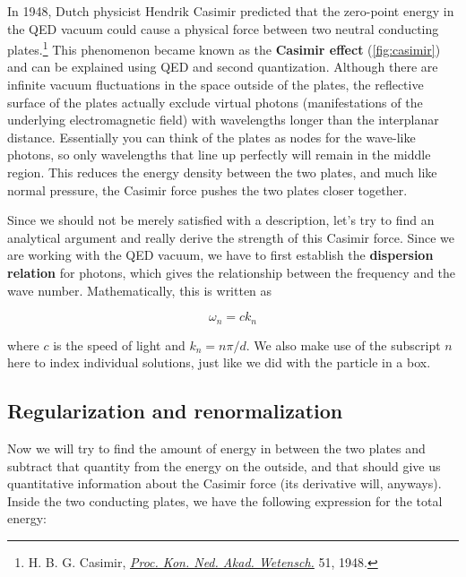 In 1948, Dutch physicist Hendrik Casimir predicted that the zero-point energy in the QED vacuum could cause a physical force between two neutral conducting plates.\footnote{H. B. G. Casimir, \href{http://www.dwc.knaw.nl/DL/publications/PU00018547.pdf}{\emph{Proc. Kon. Ned. Akad. Wetensch.}} 51, 1948.} 
This phenomenon became known as the \textbf{Casimir effect} (\autoref{fig:casimir}) and can be explained using QED and second quantization. 
Although there are infinite vacuum fluctuations in the space outside of the plates, the reflective surface of the plates actually exclude virtual photons (manifestations of the underlying electromagnetic field) with wavelengths longer than the interplanar distance. 
Essentially you can think of the plates as nodes for the wave-like photons, so only wavelengths that line up perfectly will remain in the middle region. 
This reduces the energy density between the two plates, and much like normal pressure, the Casimir force pushes the two plates closer together.

Since we should not be merely satisfied with a description, let's try to find an analytical argument and really derive the strength of this Casimir force. 
Since we are working with the QED vacuum, we have to first establish the \textbf{dispersion relation} for photons, which gives the relationship between the frequency and the wave number. 
Mathematically, this is written as

\begin{tcolorbox}[title=Dispersion relation] \vspace{-2ex}
	\begin{equation}
		\omega_n = ck_n \label{eq:dispersion}
	\end{equation}
\end{tcolorbox}

\noindent where $c$ is the speed of light and $k_n = n \pi / d$. 
We also make use of the subscript $n$ here to index individual solutions, just like we did with the particle in a box. 


\subsection{Regularization and renormalization}

Now we will try to find the amount of energy in between the two plates and subtract that quantity from the energy on the outside, and that should give us quantitative information about the Casimir force (its derivative will, anyways). 
Inside the two conducting plates, we have the following expression for the total energy:

